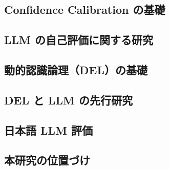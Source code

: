 
\subsection{Confidence Calibration の基礎}\label{subsec:calibration-basics}


\subsection{LLM の自己評価に関する研究}\label{subsec:llm-self-assessment}


\subsection{動的認識論理（DEL）の基礎}\label{subsec:del-basics}


\subsection{DEL と LLM の先行研究}\label{subsec:del-llm}


\subsection{日本語 LLM 評価}\label{subsec:japanese-llm}


\subsection{本研究の位置づけ}\label{subsec:positioning}


